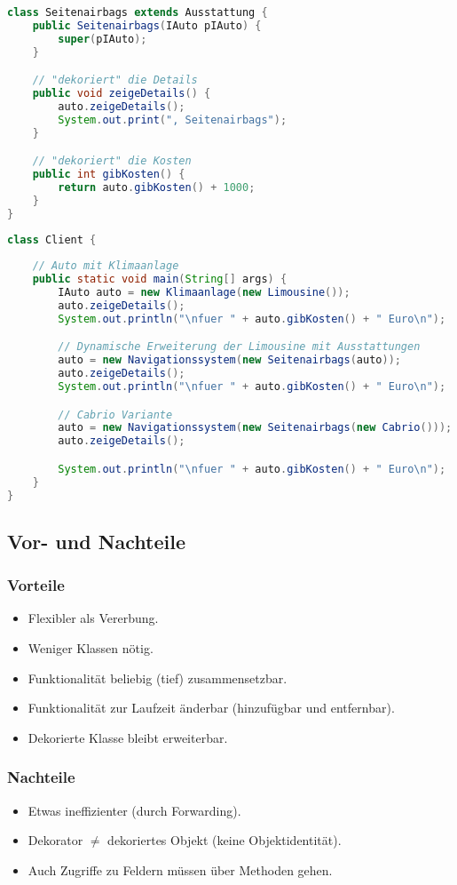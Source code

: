 \documentclass[12pt,a4paper,titlepage]{article}
\theoremstyle{definition}
\begin{document}
\begin{lstlisting}[language=Java, caption=Seitenairbag.java]
class Seitenairbags extends Ausstattung {
	public Seitenairbags(IAuto pIAuto) {
		super(pIAuto);
	}

	// "dekoriert" die Details
	public void zeigeDetails() {
		auto.zeigeDetails();
		System.out.print(", Seitenairbags");
	}

	// "dekoriert" die Kosten
	public int gibKosten() {
		return auto.gibKosten() + 1000;
	}
}
\end{lstlisting}

\newpage

\begin{lstlisting}[language=Java, caption=Client.java]
class Client {
	
	// Auto mit Klimaanlage
	public static void main(String[] args) { 
		IAuto auto = new Klimaanlage(new Limousine());
		auto.zeigeDetails();
		System.out.println("\nfuer " + auto.gibKosten() + " Euro\n");

		// Dynamische Erweiterung der Limousine mit Ausstattungen
		auto = new Navigationssystem(new Seitenairbags(auto));
		auto.zeigeDetails();
		System.out.println("\nfuer " + auto.gibKosten() + " Euro\n");

		// Cabrio Variante
		auto = new Navigationssystem(new Seitenairbags(new Cabrio()));
		auto.zeigeDetails();

		System.out.println("\nfuer " + auto.gibKosten() + " Euro\n");
	}
}
\end{lstlisting}

\subsection{Vor- und Nachteile}
\subsubsection{Vorteile}
\begin{itemize}
	\item Flexibler als Vererbung.
	\item Weniger Klassen nötig.
	\item Funktionalität beliebig (tief) zusammensetzbar.
	\item Funktionalität zur Laufzeit änderbar (hinzufügbar und entfernbar).
	\item Dekorierte Klasse bleibt erweiterbar.
\end{itemize}

\subsubsection{Nachteile}
\begin{itemize}
\item Etwas ineffizienter (durch Forwarding).
\item Dekorator $\neq$ dekoriertes Objekt (keine Objektidentität).
\item Auch Zugriffe zu Feldern müssen über Methoden gehen.
\end{itemize}
\end{document}
